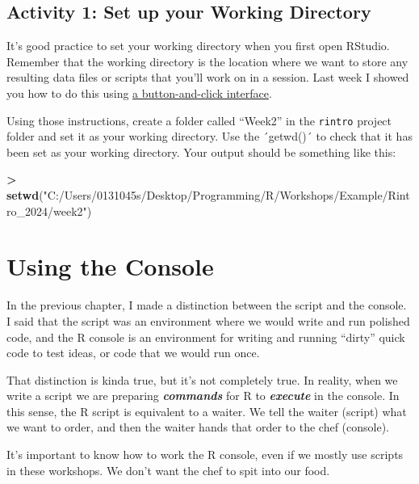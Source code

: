 \documentclass[
]{book}
\newenvironment{Shaded}{\begin{snugshade}}{\end{snugshade}}
\newcommand{\FunctionTok}[1]{\textcolor[rgb]{0.13,0.29,0.53}{\textbf{#1}}}
\newcommand{\NormalTok}[1]{#1}
\newcommand{\SpecialCharTok}[1]{\textcolor[rgb]{0.81,0.36,0.00}{\textbf{#1}}}
\newcommand{\StringTok}[1]{\textcolor[rgb]{0.31,0.60,0.02}{#1}}
\begin{document}
\hypertarget{activity-1-set-up-your-working-directory}{%
\subsection{Activity 1: Set up your Working Directory}\label{activity-1-set-up-your-working-directory}}

It's good practice to set your working directory when you first open RStudio. Remember that the working directory is the location where we want to store any resulting data files or scripts that you'll work on in a session. Last week I showed you how to do this using \protect\hyperlink{set_wd}{a button-and-click interface}.

Using those instructions, create a folder called ``Week2'' in the \texttt{rintro} project folder and set it as your working directory. Use the ´getwd()´ to check that it has been set as your working directory. Your output should be something like this:

\begin{Shaded}
\begin{Highlighting}[]
\SpecialCharTok{\textgreater{}} \FunctionTok{setwd}\NormalTok{(}\StringTok{"C:/Users/0131045s/Desktop/Programming/R/Workshops/Example/Rintro\_2024/week2"}\NormalTok{)}
\end{Highlighting}
\end{Shaded}

\hypertarget{using-the-console}{%
\section{Using the Console}\label{using-the-console}}

In the previous chapter, I made a distinction between the script and the console. I said that the script was an environment where we would write and run polished code, and the R console is an environment for writing and running ``dirty'' quick code to test ideas, or code that we would run once.

That distinction is kinda true, but it's not completely true. In reality, when we write a script we are preparing \textbf{\emph{commands}} for R to \textbf{\emph{execute}} in the console. In this sense, the R script is equivalent to a waiter. We tell the waiter (script) what we want to order, and then the waiter hands that order to the chef (console).

It's important to know how to work the R console, even if we mostly use scripts in these workshops. We don't want the chef to spit into our food.
\end{document}

